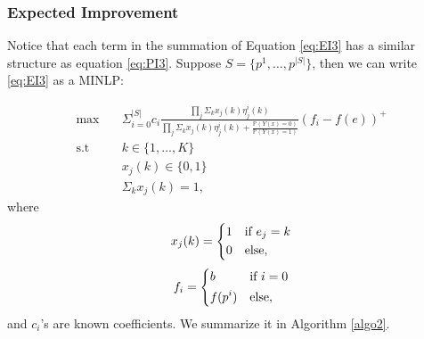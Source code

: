 \documentclass[11pt]{article}
\newcommand{\Prob}{\mathbb{P}}
\begin{document}
\subsubsection{Expected Improvement}
Notice that each term in the summation of Equation \eqref{eq:EI3} has a similar structure as equation \eqref{eq:PI3}. Suppose $S=\{p^1,\ldots,p^{|S|}\}$, then we can write \eqref{eq:EI3} as a MINLP:

\begin{equation} \label{eq:EI4}
\begin{split}
\max \quad &\Sigma_{i=0}^{|S|} c_i \frac{\prod_j \Sigma_k x_j(k) \eta_j^i(k)}{\prod_j \Sigma_k x_j(k) \eta_j^i(k) + \frac{\Prob(Y(x)=0)}{\Prob(Y(x)=1)}} (f_i-f(e))^+ \\
\text{s.t} \quad &k \in \{1,\ldots,K\} \\
&x_j(k) \in \{0,1\}\\
&\Sigma_k x_j(k)=1,
\end{split}
\end{equation}
where
\begin{equation*}
x_j(k)=\begin{dcases}
        1 & \text{if $e_j=k$}\\
        0 & \text{else},
\end{dcases}
\end{equation*}
\begin{equation*}
f_i=\begin{dcases}
        b & \text{if $i=0$}\\
        f(p^i)  & \text{else},
\end{dcases}
\end{equation*}
and $c_i$'s are known coefficients. We summarize it in Algorithm \ref{algo2}.
\end{document}
